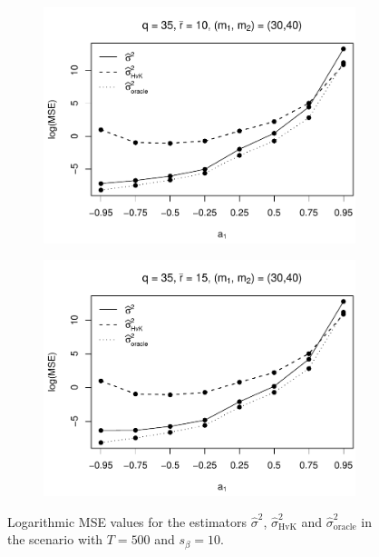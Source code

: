 \begin{figure}[p]
\begin{subfigure}[b]{0.45\textwidth}
\includegraphics[width=\textwidth]{Plots/Robustness/MSE_lrv_T=500_slope=10_(q,K1,K2,M1,M2)=(35,2,10,30,40).pdf}
\end{subfigure}
\hspace{0.25cm}
\begin{subfigure}[b]{0.45\textwidth}
\includegraphics[width=\textwidth]{Plots/Robustness/MSE_lrv_T=500_slope=10_(q,K1,K2,M1,M2)=(35,2,15,30,40).pdf}
\end{subfigure}
\caption{Logarithmic MSE values for the estimators $\widehat{\sigma}^2$, $\widehat{\sigma}^2_{\text{HvK}}$ and $\widehat{\sigma}^2_{\text{oracle}}$ in the scenario with $T=500$ and $s_\beta=10$.}\label{fig:MSE_slope10_lrv_robust} 
\end{figure}

